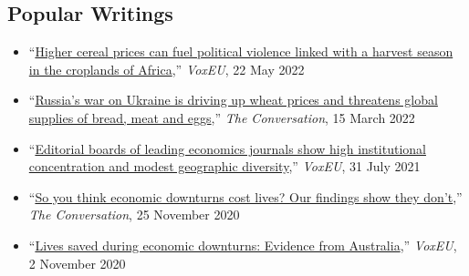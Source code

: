 \documentclass[10pt]{article}
\begin{document}
	\subsection*{Popular Writings}
	\begin{itemize}
		\item ``\href{https://voxeu.org/article/rising-cereal-prices-and-political-violence-croplands-africa}{Higher cereal prices can fuel political violence linked with a harvest season in the croplands of Africa},'' \textit{VoxEU}, 22 May 2022
		\item ``\href{https://theconversation.com/russias-war-on-ukraine-is-driving-up-wheat-prices-and-threatens-global-supplies-of-bread-meat-and-eggs-178879}{Russia’s war on Ukraine is driving up wheat prices and threatens global supplies of bread, meat and eggs},'' \textit{The Conversation}, 15 March 2022
		\item ``\href{https://voxeu.org/article/geographic-diversity-economics-journals-editorial-boards}{Editorial boards of leading economics journals show high institutional concentration and modest geographic diversity},'' \textit{VoxEU}, 31 July 2021
		\item ``\href{https://theconversation.com/so-you-think-economic-downturns-cost-lives-our-findings-show-they-dont-149711}{So you think economic downturns cost lives? Our findings show they don't},'' \textit{The Conversation}, 25 November 2020
		\item ``\href{https://voxeu.org/article/lives-saved-during-economic-downturns}{Lives saved during economic downturns: Evidence from Australia},'' \textit{VoxEU}, 2 November 2020
	\end{itemize}
	
\end{document}
